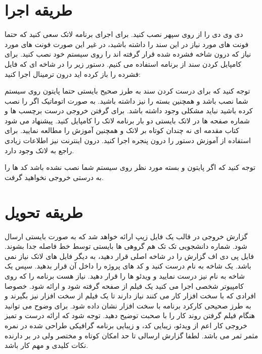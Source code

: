 \documentclass[oneside]{article}
\begin{document}
\section{طریقه اجرا}
دی وی دی
را از روی سپهر نصب کنید. 
برای اجرای برنامه لاتک سعی کنید که حتما فونت های مورد نیاز در این سند را داشته باشید، در غیر این صورت فونت های مورد نیاز که درون شاخه فشرده شده قرار گرفته اند را روی سیستم خود نصب کنید. برای کامپایل کردن سند از برنامه
\lr{\XeLaTeX}
استفاده می کنیم. دستور زیر را در شاخه ای که فایل فشرده را باز کرده اید درون ترمینال اجرا کنید:


توجه کنید که برای درست کردن سند به طرز صحیح بایستی حتما پایتون روی سیستم شما نصب باشد و همچنین بسته
را نیز داشته باشید. به صورت اتوماتیک اگر 
را نصب کرده باشید نباید مشکلی وجود داشته باشد. برای گرفتن خروجی درست برچسب ها و شماره صفحه ها در لاتک بایستی دو بار برنامه لاتک را کامپایل کنید. 
پیشنهاد می شود کتاب مقدمه ای نه چندان کوتاه بر لاتک و همچنین آموزش 
\lr{\XePersian}
را مطالعه نمایید. برای استفاده از آموزش
\lr{\XePersian}
دستور 
را درون پنجره
اجرا کنید. درون اینترنت نیز اطلاعات زیادی راجع به لاتک وجود دارد.
\begin{tcolorbox}
توجه کنید که اگر پایتون و بسته مورد نظر روی سیستم شما نصب نشده باشد کد ها را به درستی خروجی نخواهید گرفت.
\end{tcolorbox}

\section{طریقه تحویل}
گزارش خروجی در قالب یک فایل زیپ ارائه خواهد شد که به صورت
بایستی ارسال شود. شماره دانشجویی تک تک هم گروهی ها بایستی توسط خط فاصله جدا بشوند.  فایل پی دی اف گزارش را در شاخه اصلی قرار دهید، به دیگر فایل های لاتک نیاز نمی باشد. یک شاخه به نام 
درست کنید و کد های پروژه را داخل آن قرار بدهید. سپس یک شاخه به نام
نیز درست نمایید و ویدئو ها را قرار دهید. نیاز هست برنامه را که روی کامپیوتر شخصی اجرا می کنید یک فیلم از صفحه گرفته شود و ارائه شود. خصوصا افرادی که با سخت افزار کار می کنند نیاز دارند تا یک فیلم از سخت افزار نیز بگیرند و به طرز صحیحی کارکرد برنامه با سخت افزار نشان داده شود. برای وضوح می توانید هنگام فیلم گرفتن روند کار را با صحبت توضیح دهید. توجه شود که ارائه درست و تمیز خروجی کار  اعم از ویدئو، زیبایی کد، و زیبایی برنامه گرافیکی طراحی شده در نمره مثمر ثمر می باشد. لطفا گزارش ارسالی تا حد امکان کوتاه و مختصر ولی در بر دارنده نکات کلیدی و مهم کار باشد.
\end{document}
